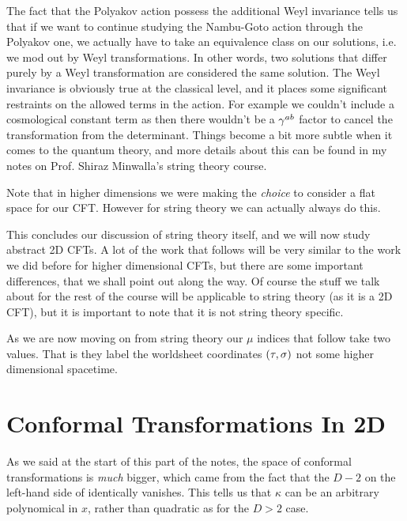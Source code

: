 
\badr 
    The fact that the Polyakov action possess the additional Weyl invariance tells us that if we want to continue studying the Nambu-Goto action through the Polyakov one, we actually have to take an equivalence class on our solutions, i.e. we mod out by Weyl transformations. In other words, two solutions that differ purely by a Weyl transformation are considered the same solution. The Weyl invariance is obviously true at the classical level, and it places some significant restraints on the allowed terms in the action. For example we couldn't include a cosmological constant term as then there wouldn't be a $\gamma^{ab}$ factor to cancel the transformation from the determinant. Things become a bit more subtle when it comes to the quantum theory, and more details about this can be found in my notes on Prof. Shiraz Minwalla's string theory course. 
\eadr 

\br 
    Note that in higher dimensions we were making the \textit{choice} to consider a flat space for our CFT. However for string theory we can actually always do this. 
\er 

This concludes our discussion of string theory itself, and we will now study abstract 2D CFTs. A lot of the work that follows will be very similar to the work we did before for higher dimensional CFTs, but there are some important differences, that we shall point out along the way. Of course the stuff we talk about for the rest of the course will be applicable to string theory (as it is a 2D CFT), but it is important to note that it is not string theory specific. 

\bnn 
    As we are now moving on from string theory our $\mu$ indices that follow take two values. That is they label the worldsheet coordinates $(\tau,\sigma)$ not some higher dimensional spacetime. 
\enn 

\section{Conformal Transformations In 2D}

As we said at the start of this part of the notes, the space of conformal transformations is \textit{much} bigger, which came from the fact that the $D-2$ on the left-hand side of  identically vanishes. This tells us that $\kappa$ can be an arbitrary polynomical in $x$, rather than quadratic as for the $D>2$ case.

